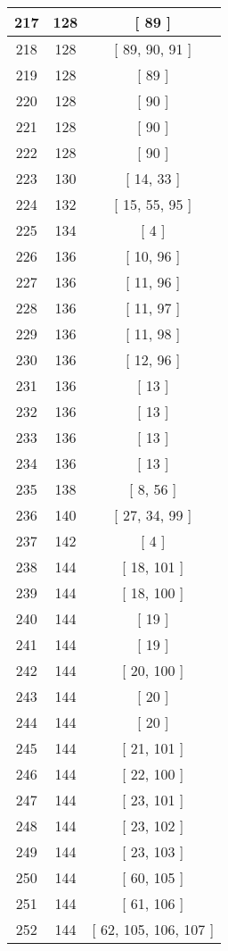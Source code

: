\begin{center}
\begin{longtable}[H]{|| c c c ||}
\hline
217 & 128 & [ 89 ] \\ 
\hline
218 & 128 & [ 89, 90, 91 ] \\ 
\hline
219 & 128 & [ 89 ] \\ 
\hline
220 & 128 & [ 90 ] \\ 
\hline
221 & 128 & [ 90 ] \\ 
\hline
222 & 128 & [ 90 ] \\ 
\hline
223 & 130 & [ 14, 33 ] \\ 
\hline
224 & 132 & [ 15, 55, 95 ] \\ 
\hline
225 & 134 & [ 4 ] \\ 
\hline
226 & 136 & [ 10, 96 ] \\ 
\hline
227 & 136 & [ 11, 96 ] \\ 
\hline
228 & 136 & [ 11, 97 ] \\ 
\hline
229 & 136 & [ 11, 98 ] \\ 
\hline
230 & 136 & [ 12, 96 ] \\ 
\hline
231 & 136 & [ 13 ] \\ 
\hline
232 & 136 & [ 13 ] \\ 
\hline
233 & 136 & [ 13 ] \\ 
\hline
234 & 136 & [ 13 ] \\ 
\hline
235 & 138 & [ 8, 56 ] \\ 
\hline
236 & 140 & [ 27, 34, 99 ] \\ 
\hline
237 & 142 & [ 4 ] \\ 
\hline
238 & 144 & [ 18, 101 ] \\ 
\hline
239 & 144 & [ 18, 100 ] \\ 
\hline
240 & 144 & [ 19 ] \\ 
\hline
241 & 144 & [ 19 ] \\ 
\hline
242 & 144 & [ 20, 100 ] \\ 
\hline
243 & 144 & [ 20 ] \\ 
\hline
244 & 144 & [ 20 ] \\ 
\hline
245 & 144 & [ 21, 101 ] \\ 
\hline
246 & 144 & [ 22, 100 ] \\ 
\hline
247 & 144 & [ 23, 101 ] \\ 
\hline
248 & 144 & [ 23, 102 ] \\ 
\hline
249 & 144 & [ 23, 103 ] \\ 
\hline
250 & 144 & [ 60, 105 ] \\ 
\hline
251 & 144 & [ 61, 106 ] \\ 
\hline
252 & 144 & [ 62, 105, 106, 107 ] \\ 

\end{longtable}
\end{center}
